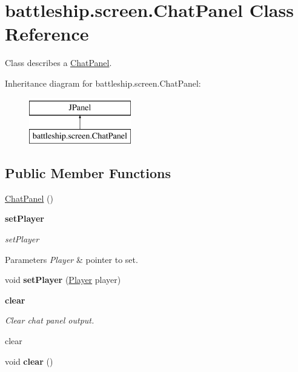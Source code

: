 \hypertarget{classbattleship_1_1screen_1_1ChatPanel}{}\section{battleship.\+screen.\+Chat\+Panel Class Reference}
\label{classbattleship_1_1screen_1_1ChatPanel}


Class describes a \hyperlink{classbattleship_1_1screen_1_1ChatPanel}{Chat\+Panel}.  


Inheritance diagram for battleship.\+screen.\+Chat\+Panel\+:\begin{figure}[H]
\begin{center}
\leavevmode
\includegraphics[height=2.000000cm]{classbattleship_1_1screen_1_1ChatPanel}
\end{center}
\end{figure}
\subsection*{Public Member Functions}
\begin{DoxyCompactItemize}
\item 
\hyperlink{classbattleship_1_1screen_1_1ChatPanel_a8a74325b96692dbf40cbff0f4bcdab50}{Chat\+Panel} ()
\end{DoxyCompactItemize}
\begin{Indent}{\bf set\+Player}\par
{\em set\+Player


\begin{DoxyParams}{Parameters}
{\em Player} & pointer to set. \\
\hline
\end{DoxyParams}
}\begin{DoxyCompactItemize}
\item 
\hypertarget{classbattleship_1_1screen_1_1ChatPanel_a91b586a77c18da0afa53d484c6cefc97}{}void {\bfseries set\+Player} (\hyperlink{classbattleship_1_1game_1_1Player}{Player} player)\label{classbattleship_1_1screen_1_1ChatPanel_a91b586a77c18da0afa53d484c6cefc97}

\end{DoxyCompactItemize}
\end{Indent}
\begin{Indent}{\bf clear}\par
{\em Clear chat panel output.

clear }\begin{DoxyCompactItemize}
\item 
\hypertarget{classbattleship_1_1screen_1_1ChatPanel_a8786888be243abbffd9091290fab45f5}{}void {\bfseries clear} ()\label{classbattleship_1_1screen_1_1ChatPanel_a8786888be243abbffd9091290fab45f5}

\end{DoxyCompactItemize}
\end{Indent}


